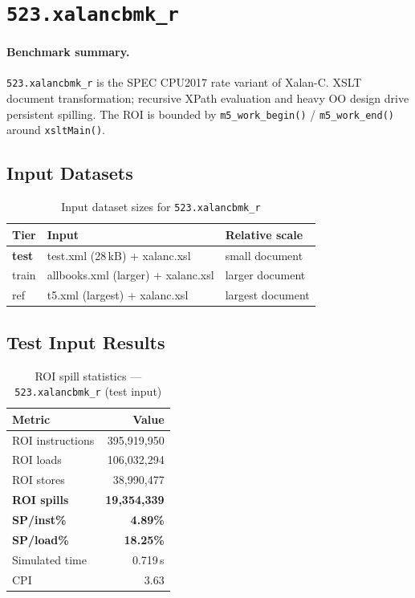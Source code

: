 \documentclass[11pt,a4paper]{article}
\begin{document}
\section{\texttt{523.xalancbmk\_r}}
\label{sec:xalancbmk}

\paragraph{Benchmark summary.}
\texttt{523.xalancbmk\_r} is the SPEC CPU2017 rate variant of Xalan-C.
XSLT document transformation; recursive XPath evaluation and heavy OO design drive persistent spilling.
The ROI is bounded by \texttt{m5\_work\_begin()} / \texttt{m5\_work\_end()}
around \texttt{xsltMain()}.

\subsection{Input Datasets}

\begin{table}[H]
\centering
\caption{Input dataset sizes for \texttt{523.xalancbmk\_r}}
\label{tab:xalancbmk_inputs}
\small
\begin{tabular}{lp{8cm}l}
\toprule
\textbf{Tier} & \textbf{Input} & \textbf{Relative scale} \\
\midrule
\textbf{test} & test.xml (28\,kB) + xalanc.xsl & small document \\
train & allbooks.xml (larger) + xalanc.xsl & larger document \\
ref & t5.xml (largest) + xalanc.xsl & largest document \\
\bottomrule
\end{tabular}
\end{table}

\subsection{Test Input Results}

\begin{table}[H]
\centering
\caption{ROI spill statistics --- \texttt{523.xalancbmk\_r} (test input)}
\label{tab:xalancbmk_test_roi}
\begin{tabular}{lr}
\toprule
\textbf{Metric} & \textbf{Value} \\
\midrule
ROI instructions & 395,919,950 \\
ROI loads        & 106,032,294 \\
ROI stores       & 38,990,477 \\
\textbf{ROI spills}   & \textbf{19,354,339} \\
\textbf{SP/inst\%}   & \textbf{4.89\%} \\
\textbf{SP/load\%}   & \textbf{18.25\%} \\
Simulated time   & 0.719\,s \\
CPI              & 3.63 \\
\bottomrule
\end{tabular}
\end{table}
\end{document}
